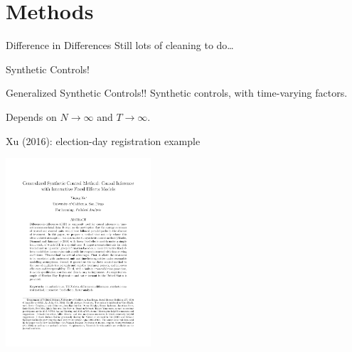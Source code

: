 \documentclass[aspectratio=169]{beamer}
\begin{document}
\section{Methods}

\begin{frame}{Difference in Differences}
	Still lots of cleaning to do\ldots
\end{frame}

{
\begin{frame}[plain]
\end{frame}
}

\begin{frame}{Synthetic Controls!}
\end{frame}


\begin{frame}{Generalized Synthetic Controls!!}
	Synthetic controls, with time-varying factors.

	Depends on $N\to\infty$ and $T\to\infty$.
\end{frame}

\begin{frame}{Xu (2016): election-day registration example}
	\vspace*{-0.1cm}
	\begin{center}
		\includegraphics[page=25, trim = 2.5cm 15.5cm 2.0cm 3.0cm, clip,height=7cm]{../../../Papers/Econometrics/Xu_2016.pdf}
	\end{center}
\end{frame}
\end{document}
